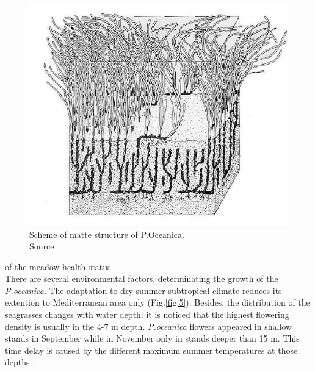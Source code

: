\documentclass[10pt, a4paper]{article}
\begin{document}
\begin{figure}
\centering
\includegraphics[scale=0.15]{Fig-1-7.jpg}
\caption{Scheme of matte structure of
P.Oceanica.\\ Source \cite{Pergent90}\label{Pergent90}}
\label{fig:7}
\end{figure}

of the meadow health status. \\
There are several environmental factors, determinating the growth of the \textit{P.oceanica}. The adaptation
to dry-summer subtropical climate reduces its extention to Mediterranean area only (Fig.\ref{fig:5}).
Besides, the distribution of the seagrasses changes with water depth: it is noticed \cite{Dural10}\label{Dural10} that
the highest flowering density is usually in the 4-7 m depth. 
\textit{P.oceanica} flowers appeared in shallow
stands in September while in November only in stands deeper than 15 m. This time delay is caused by
the different maximum summer temperatures at those depths \cite{Buia91}\label{Buia91}.
\end{document}
